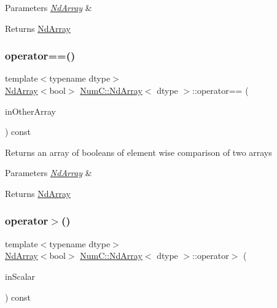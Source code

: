 \begin{DoxyParams}{Parameters}
{\em \mbox{\hyperlink{class_num_c_1_1_nd_array}{Nd\+Array}}} & \\
\hline
\end{DoxyParams}
\begin{DoxyReturn}{Returns}
\mbox{\hyperlink{class_num_c_1_1_nd_array}{Nd\+Array}} 
\end{DoxyReturn}
\mbox{\label{class_num_c_1_1_nd_array_a3abe0b9a995e04444d124a4d3b4b332e}} 
\subsubsection{\texorpdfstring{operator==()}{operator==()}\hspace{0.1cm}{\footnotesize\ttfamily [2/2]}}
{\footnotesize\ttfamily template$<$typename dtype$>$ \\
\mbox{\hyperlink{class_num_c_1_1_nd_array}{Nd\+Array}}$<$bool$>$ \mbox{\hyperlink{class_num_c_1_1_nd_array}{Num\+C\+::\+Nd\+Array}}$<$ dtype $>$\+::operator== (\begin{DoxyParamCaption}\item[{const \mbox{\hyperlink{class_num_c_1_1_nd_array}{Nd\+Array}}$<$ dtype $>$ \&}]{in\+Other\+Array }\end{DoxyParamCaption}) const\hspace{0.3cm}{\ttfamily [inline]}}

Returns an array of booleans of element wise comparison of two arrays


\begin{DoxyParams}{Parameters}
{\em \mbox{\hyperlink{class_num_c_1_1_nd_array}{Nd\+Array}}} & \\
\hline
\end{DoxyParams}
\begin{DoxyReturn}{Returns}
\mbox{\hyperlink{class_num_c_1_1_nd_array}{Nd\+Array}} 
\end{DoxyReturn}
\mbox{\label{class_num_c_1_1_nd_array_aa00a43e8341f4322f182619f83e7a64c}} 
\subsubsection{\texorpdfstring{operator$>$()}{operator>()}\hspace{0.1cm}{\footnotesize\ttfamily [1/2]}}
{\footnotesize\ttfamily template$<$typename dtype$>$ \\
\mbox{\hyperlink{class_num_c_1_1_nd_array}{Nd\+Array}}$<$bool$>$ \mbox{\hyperlink{class_num_c_1_1_nd_array}{Num\+C\+::\+Nd\+Array}}$<$ dtype $>$\+::operator$>$ (\begin{DoxyParamCaption}\item[{dtype}]{in\+Scalar }\end{DoxyParamCaption}) const\hspace{0.3cm}{\ttfamily [inline]}}

